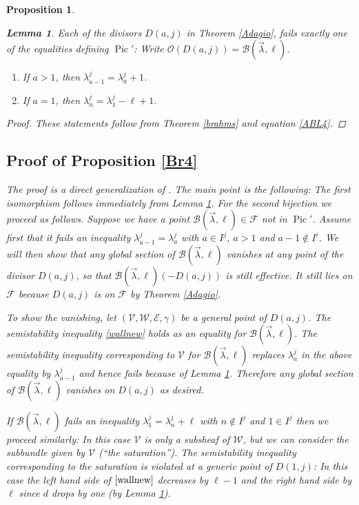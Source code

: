 \documentclass[11pt]{amsart}
\newcommand\mf{\mathcal{F}}
\newcommand\Pic{\operatorname{Pic}}
\newcommand\me{\mathcal{E}}
\newcommand\mv{\mathcal{V}}
\newcommand\mw{\mathcal{W}}
\newtheorem{proposition}[theorem]{Proposition}
\newtheorem{lemma}[theorem]{Lemma}
\numberwithin{theorem}{subsection}
\begin{document}
{\begin{proposition}
\begin{lemma}\label{oneoff}
Each of the divisors $D(a,j)$ in Theorem \ref{Adagio}, fails exactly one of the equalities defining $\Pic'$:
Write $\mathcal{O}(D(a,j))=\mathcal{B}(\vec{\lambda},\ell)$.
\begin{enumerate}
\item If $a>1$, then $\lambda^j_{a-1}=\lambda^j_{a}+1$.
\item If $a=1$, then $\lambda^j_n =\lambda^j_1-\ell +1$.
\end{enumerate}
\end{lemma}
\begin{proof}
These statements follow from Theorem \ref{brahms} and  equation \eqref{ABL4}.
\end{proof}

\subsection{Proof of Proposition \ref{Br4}}

The proof is a direct generalization of \cite[Theorem 1.15]{BHermit}. The main point is the following: The first isomorphism follows immediately from Lemma \ref{oneoff}. For the second bijection we proceed as follows. Suppose we have  a point $\mathcal{B}(\vec{\lambda},\ell)\in\mf$ not in $\Pic'$. Assume first that it fails an inequality $\lambda^j_{a-1}=\lambda^{j}_{a}$ with $a\in I^j$, $a>1$ and $a-1\not\in I^i$. We will then show that any global section of  $\mathcal{B}(\vec{\lambda},\ell)$ vanishes at any point of the divisor $D(a,j)$, so that $\mathcal{B}(\vec{\lambda},\ell)(-D(a,j))$ is still effective. It still lies on $\mf$ because $D(a,j)$ is on $\mf$ by Theorem \ref{Adagio}.

To show the vanishing, let $(\mv,\mw,\me,\gamma)$ be a general point of $D(a,j)$. The semistability inequality \eqref{wallnew} holds as an equality for $\mathcal{B}(\vec{\lambda},\ell)$. The semistability inequality corresponding to $\mv$  for $\mathcal{B}(\vec{\lambda},\ell)$  replaces $\lambda^j_a$ in the above equality by $\lambda^j_{a-1}$ and hence fails because of Lemma \ref{oneoff}. Therefore any global section of $\mathcal{B}(\vec{\lambda},\ell)$ vanishes on $D(a,j)$ as desired.


If $\mathcal{B}(\vec{\lambda},\ell)$  fails an inequality  $\lambda^j_1=\lambda^{j}_{n}+\ell$ with $n\not\in I^j$ and $1\in I^j$ then we proceed similarly: In this case $\mv$ is only a subsheaf of $\mw$, but we can consider the subbundle given by $\mv$ (``the saturation''). The semistability inequality corresponding to the saturation is violated at a generic point of $D(1,j)$: In this case the left hand side of $\eqref{wallnew}$ decreases by $\ell-1$ and the right hand side by $\ell$ since $d$ drops by one (by Lemma \ref{oneoff}).



\end{proposition}}
\end{document}

